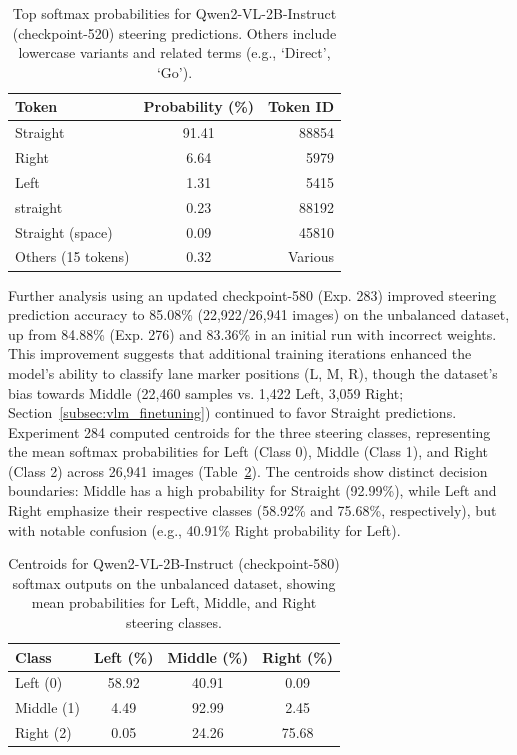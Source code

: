 \begin{table}[ht]
\centering
\begin{tabular}{@{}lcr@{}}
\toprule
Token & Probability (\%) & Token ID \\
\midrule
Straight & 91.41 & 88854 \\
Right & 6.64 & 5979 \\
Left & 1.31 & 5415 \\
straight & 0.23 & 88192 \\
Straight (space) & 0.09 & 45810 \\
Others (15 tokens) & 0.32 & Various \\
\bottomrule
\end{tabular}
\caption{Top softmax probabilities for Qwen2-VL-2B-Instruct (checkpoint-520) steering predictions. Others include lowercase variants and related terms (e.g., `Direct', `Go').}
\label{tab:qwen_softmax}
\end{table}

Further analysis using an updated checkpoint-580 (Exp. 283) improved steering prediction accuracy to 85.08\% (22,922/26,941 images) on the unbalanced dataset, up from 84.88\% (Exp. 276) and 83.36\% in an initial run with incorrect weights. This improvement suggests that additional training iterations enhanced the model’s ability to classify lane marker positions (L, M, R), though the dataset’s bias towards Middle (22,460 samples vs. 1,422 Left, 3,059 Right; Section~\ref{subsec:vlm_finetuning}) continued to favor Straight predictions. Experiment 284 computed centroids for the three steering classes, representing the mean softmax probabilities for Left (Class 0), Middle (Class 1), and Right (Class 2) across 26,941 images (Table~\ref{tab:qwen_centroids}). The centroids show distinct decision boundaries: Middle has a high probability for Straight (92.99\%), while Left and Right emphasize their respective classes (58.92\% and 75.68\%, respectively), but with notable confusion (e.g., 40.91\% Right probability for Left).

\begin{table}[ht]
\centering
\begin{tabular}{@{}lccc@{}}
\toprule
Class & Left (\%) & Middle (\%) & Right (\%) \\
\midrule
Left (0) & 58.92 & 40.91 & 0.09 \\
Middle (1) & 4.49 & 92.99 & 2.45 \\
Right (2) & 0.05 & 24.26 & 75.68 \\
\bottomrule
\end{tabular}
\caption{Centroids for Qwen2-VL-2B-Instruct (checkpoint-580) softmax outputs on the unbalanced dataset, showing mean probabilities for Left, Middle, and Right steering classes.}
\label{tab:qwen_centroids}
\end{table}

